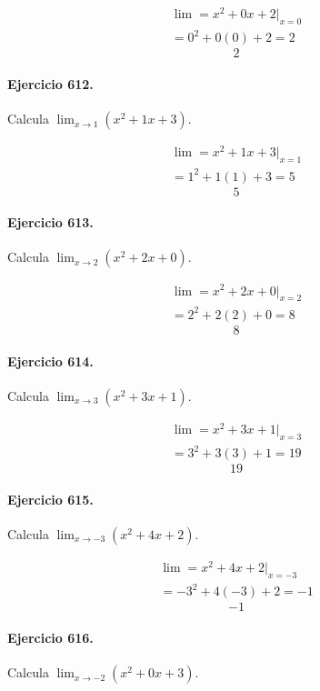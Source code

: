 \documentclass[11pt,a4paper]{article}
\begin{document}
\[
\begin{aligned}
\lim=x^2+0x+2\big|_{x=0}\\
=0^2+0(0)+2=2
\end{aligned}
\]
\[\boxed{2}\]


\paragraph{Ejercicio 612.} Calcula $\displaystyle\lim_{x\to 1}(x^2+1x+3)$.

\[
\begin{aligned}
\lim=x^2+1x+3\big|_{x=1}\\
=1^2+1(1)+3=5
\end{aligned}
\]
\[\boxed{5}\]


\paragraph{Ejercicio 613.} Calcula $\displaystyle\lim_{x\to 2}(x^2+2x+0)$.

\[
\begin{aligned}
\lim=x^2+2x+0\big|_{x=2}\\
=2^2+2(2)+0=8
\end{aligned}
\]
\[\boxed{8}\]


\paragraph{Ejercicio 614.} Calcula $\displaystyle\lim_{x\to 3}(x^2+3x+1)$.

\[
\begin{aligned}
\lim=x^2+3x+1\big|_{x=3}\\
=3^2+3(3)+1=19
\end{aligned}
\]
\[\boxed{19}\]


\paragraph{Ejercicio 615.} Calcula $\displaystyle\lim_{x\to -3}(x^2+4x+2)$.

\[
\begin{aligned}
\lim=x^2+4x+2\big|_{x=-3}\\
=-3^2+4(-3)+2=-1
\end{aligned}
\]
\[\boxed{-1}\]


\paragraph{Ejercicio 616.} Calcula $\displaystyle\lim_{x\to -2}(x^2+0x+3)$.
\end{document}
